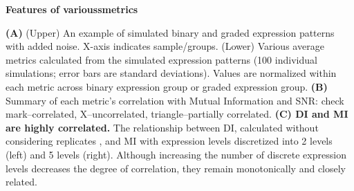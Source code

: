 \textbf{Features of varioussmetrics}

\textbf{(A)} (Upper) An example of simulated binary and graded expression patterns with added noise. X-axis indicates sample/groups. (Lower) Various average metrics calculated from the simulated expression patterns (100 individual simulations; error bars are standard deviations). Values are normalized within each metric across binary expression group or graded expression group. 
\textbf{(B)} Summary of each metric's correlation with Mutual Information and SNR: check mark--correlated, X--uncorrelated, triangle--partially correlated.
\textbf{(C) DI and MI are highly correlated.} The relationship between DI, calculated without considering replicates%
, and MI with expression levels discretized into 2 levels (left) and 5 levels (right). Although increasing the number of discrete expression levels decreases the degree of correlation, they remain monotonically and closely related.

